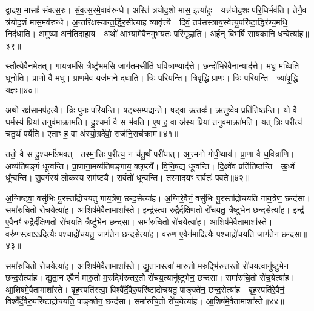 द्वाद॑श॒ मासाः᳚ संवत्स॒रः। 
सं॒व॒त्स॒रमे॒वाव॑रुन्धे। 
अस्ति॑ त्रयोद॒शो मास॒ इत्या॑हुः। 
यत्त्र॑योद॒शः प॑रि॒धिर्भव॑ति। 
तेनै॒व त्र॑योद॒शं मास॒मव॑रुन्धे। 
अ॒न्तरि॑क्षस्यान्त॒र्द्धिर॒सीत्या॑ह॒ व्यावृ॑त्त्यै। 
दिवं॒ तप॑सस्त्राय॒स्वेत्यु॒परि॑ष्टा॒द्धिर॑ण्य॒मधि॒ निद॑धाति। 
अ॒मुष्या॒ अन॑तिदाहाय। 
अथो॑ आ॒भ्यामे॒वैन॑मुभ॒यतः॒ परि॑गृह्णाति। 
अर्\mbox{}ह॑न् बिभर्\mbox{}षि॒ साय॑कानि॒ धन्वेत्या॑ह॥३९॥

स्तौत्ये॒वैन॑मे॒तत्। 
गा॒य॒त्रम॑सि॒ त्रैष्टु॑भमसि॒ जाग॑तम॒सीति॑ ध॒वित्रा॒ण्याद॑त्ते। 
छन्दो॑भिरे॒वैना॒न्याद॑त्ते। 
मधु॒ मध्विति॑ धूनोति। 
प्रा॒णो वै मधु॑। 
प्रा॒णमे॒व यज॑माने दधाति। 
त्रिः परि॑यन्ति। 
त्रि॒वृद्धि प्रा॒णः। 
त्रिः परि॑यन्ति। 
त्र्या॑वृ॒द्धि य॒ज्ञः॥४०॥

अथो॒ रक्ष॑सा॒मप॑हत्यै। 
त्रिः पुनः॒ परि॑यन्ति। 
षट्थ्सम्प॑द्यन्ते। 
षड्वा ऋ॒तवः॑। 
ऋ॒तुष्वे॒व प्रति॑तिष्ठन्ति। 
यो वै घ॒र्मस्य॑ प्रि॒यां त॒नुव॑मा॒क्राम॑ति। 
दु॒श्चर्मा॒ वै स भ॑वति। 
ए॒ष ह॒ वा अ॑स्य प्रि॒यां त॒नुव॒माक्रा॑मति। 
यत् त्रिः प॒रीत्य॑ चतु॒र्थं पर्ये॑ति। 
ए॒ताꣳ ह॒ वा अ॑स्यो॒ग्रदे॑वो॒ राज॑नि॒राच॑क्राम॥४१॥

ततो॒ वै स दु॒श्चर्मा॑ऽभवत्। 
तस्मा॒त्त्रिः प॒रीत्य॒ न च॑तु॒र्थं परी॑यात्। 
आ॒त्मनो॑ गोपी॒थाय॑। 
प्रा॒णा वै ध॒वित्रा॑णि। 
अव्य॑तिषङ्गं धून्वन्ति। 
प्रा॒णाना॒मव्य॑तिषङ्गाय॒ क्लृप्त्यै᳚। 
वि॒नि॒षद्य॑ धून्वन्ति। 
दि॒क्ष्वे॑व प्रति॑तिष्ठन्ति। 
ऊ॒र्ध्वं धू᳚न्वन्ति। 
सु॒व॒र्गस्य॑ लो॒कस्य॒ सम॑ष्ट्यै। 
स॒र्वतो॑ धून्वन्ति। 
तस्मा॑द॒यꣳ स॒र्वतः॑ पवते॥४२॥
\anuvakamend[द॒धा॒ती॒वान्वा॑ह य॒ज्ञस्या॑है॒ष उ॒परि॑ष्टादाशीर॒न्यो व्या᳚स्था॒पय॑न्ति र॒श्मयो॑ भवन्ति॒ धन्वेत्या॑ह य॒ज्ञश्च॑क्राम॒ सम॑ष्ट्यै॒ द्वे च॑]

अ॒ग्निष्ट्वा॒ वसु॑भिः पु॒रस्ता᳚द्रोचयतु गाय॒त्रेण॒ छन्द॒सेत्या॑ह। 
अ॒ग्निरे॒वैनं॒ वसु॑भिः पु॒रस्ता᳚द्रोचयति गाय॒त्रेण॒ छन्द॑सा। 
समा॑रुचि॒तो रो॑च॒येत्या॑ह। 
आ॒शिष॑मे॒वैतामाशा᳚स्ते। 
इन्द्र॑स्त्वा रु॒द्रैर्द॑क्षिण॒तो रो॑चयतु॒ त्रैष्टु॑भेन॒ छन्द॒सेत्या॑ह। 
इन्द्र॑ ए॒वैनꣳ॑ रु॒द्रैर्द॑क्षिण॒तो रो॑चयति॒ त्रैष्टु॑भेन॒ छन्द॑सा। 
समा॑रुचि॒तो रो॑च॒येत्या॑ह। 
आ॒शिष॑मे॒वैतामाशा᳚स्ते। 
वरु॑णस्त्वाऽऽदि॒त्यैः प॒श्चाद्रो॑चयतु॒ जाग॑तेन॒ छन्द॒सेत्या॑ह। 
वरु॑ण ए॒वैन॑मादि॒त्यैः प॒श्चाद्रो॑चयति॒ जाग॑तेन॒ छन्द॑सा॥४३॥

समा॑रुचि॒तो रो॑च॒येत्या॑ह। 
आ॒शिष॑मे॒वैतामाशा᳚स्ते। 
द्यु॒ता॒नस्त्वा॑ मारु॒तो म॒रुद्भि॑रुत्तर॒तो रो॑चय॒त्वानु॑ष्टुभेन॒ छन्द॒सेत्या॑ह। 
द्यु॒ता॒न ए॒वैनं॑ मारु॒तो म॒रुद्भि॑रुत्तर॒तो रो॑चय॒त्यानु॑ष्टुभेन॒ छन्द॑सा। 
समा॑रुचि॒तो रो॑च॒येत्या॑ह। 
आ॒शिष॑\-मे॒वैतामाशा᳚स्ते। 
बृह॒स्पति॑स्त्वा॒ विश्वै᳚र्दे॒वैरु॒परि॑ष्टा\-द्रोचयतु॒ पाङ्क्ते॑न॒ छन्द॒सेत्या॑ह। 
बृह॒स्पति॑रे॒वैनं॒  विश्वै᳚र्दे॒वै\-रु॒परि॑ष्टाद्रोचयति॒ पाङ्क्ते॑न॒ छन्द॑सा। 
समा॑रुचि॒तो रो॑च॒येत्या॑ह। 
आ॒शिष॑मे॒वैतामाशा᳚स्ते॥४४॥

